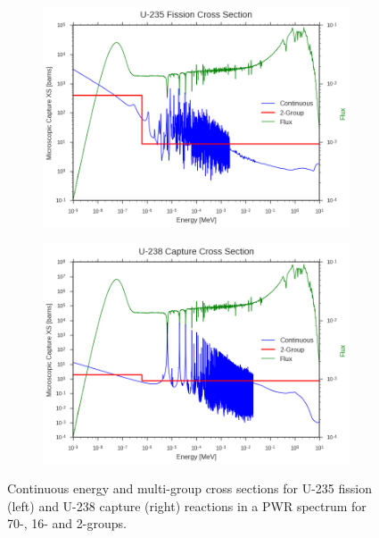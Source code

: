 \begin{figure}
\begin{subfigure}{.5\textwidth}
  \includegraphics[width=\linewidth]{figures/intro/u235-fission-2}
  \caption{}
\end{subfigure}
\begin{subfigure}{.5\textwidth}
  \centering
  \includegraphics[width=\linewidth]{figures/intro/u238-capture-2}
  \caption{}
\end{subfigure}
\caption[Uranium-235 and Uranium-238 cross sections]{Continuous energy and multi-group cross sections for U-235 fission (left) and U-238 capture (right) reactions in a PWR spectrum for 70-, 16- and 2-groups.}
\label{fig:pwr-ce-mg-xs}
\end{figure}
